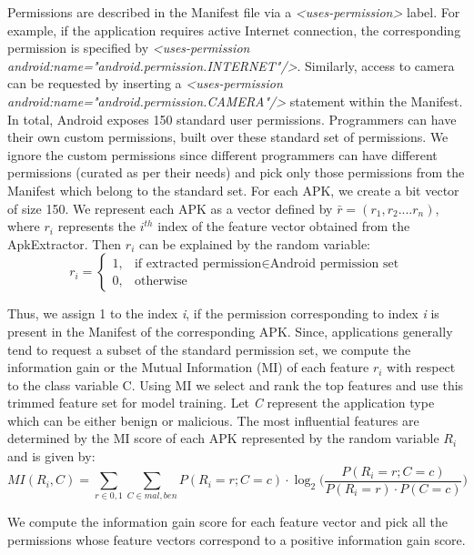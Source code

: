 Permissions are described in the Manifest file via a \textit{<uses-permission>} label. For example, if the application requires active Internet connection, the corresponding permission is specified by \textit{<uses-permission
android:name="android.permission.INTERNET"/>}. Similarly, access to camera can be requested by inserting a \textit{<uses-permission android:name="android.permission.CAMERA"/>} statement within the Manifest. In total, Android exposes 150 standard user permissions\cite{Permission}. Programmers can have their own custom permissions, built over these standard set of permissions. We ignore the custom permissions since different programmers can have different permissions (curated as per their needs) and pick only those permissions from the Manifest which belong to the standard set. For each APK, we create a bit vector of size 150. We represent each APK as a vector defined by $\bar{r} = (r_{1}, r_{2}....r_{n})$, where $r_{i}$ represents the $i^{th}$ index of the feature vector obtained from the ApkExtractor. Then $r_{i}$ can be explained by the random variable:
\[
    r_i= 
\begin{cases}
    1,& \text{if extracted permission} \in \text{Android permission set} \\
    0,              & \text{otherwise}
\end{cases}
\]

Thus, we assign 1 to the index \textit{i}, if the permission corresponding to index \textit{i} is present in the Manifest of the corresponding APK. Since, applications generally tend to request a subset of the standard permission set, we compute the information gain or the Mutual Information (MI)\cite{cover2012elements} of each feature $r_{i}$ with respect to the class variable C. Using MI we select and rank the top features and use this trimmed feature set for model training. Let \textit{C} represent the application type which can be either benign or malicious. The most influential features are determined by the MI score of each APK represented by the random variable $R_{i}$ and is given by:
 \small
\begin{equation}	\label{eqMI}
MI(R_{i}, C) = \sum_{r\in { 0,1}} \sum_{C\in {mal, ben}}P(R_{i}=r;C=c)\cdot \log_2 \Big(\frac{P(R_{i}=r;C=c)}{P(R_{i}=r)\cdot P(C=c)}\Big)
\end{equation} \normalsize

We compute the information gain score for each feature vector and pick all the permissions whose feature vectors correspond to a positive information gain score. 

